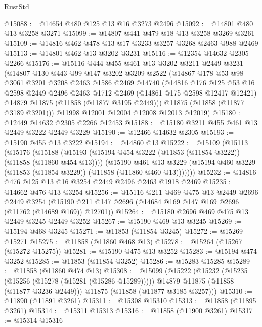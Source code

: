 \begin{lexlean}{RustStd}
\begin{coremodule}
@15088 := @14654 @480 @125 @13 @16 @3273 @2496
@15092 := @14801 @480 @13 @3258 @3271
@15099 := @14807 @441 @479 @18 @13 @3258 @3269 @3261
@15109 := @14816 @462 @478 @13 @17 @3233 @3257 @3268 @2463 @988 @2469
@15113 := @14801 @462 @13 @3202 @3231
@15116 := @12354 @14632 @2305 @2266
@15176 := @15116
    @444
    @455
    @461
    @13
    @3202
    @3211
    @2449
    @3231
    (@14807
      @130
      @443
      @99
      @147
      @3202
      @3209
      @2522
      (@14867
        @178
        @53
        @98
        @3061
        @3201
        @3208
        @2463
        @1586
        @2469
        @14740
        (@14816
          @176
          @125
          @53
          @16
          @2598
          @2449
          @2496
          @2463
          @1712
          @2469
          (@14861 @175 @2598 @12417 @12421)
          @14879
          @11875
          (@11858 (@11877 @3195 @2449)))
        @11875
        (@11858 (@11877 @3189 @3201)))
      @11998
      @12001
      @12004
      @12008
      @12013
      @12019)
@15180 := @12449 @14632 @2305 @2266 @12453
@15188 := @15180 @3211 @455 @461 @13 @2449 @3222 @2449 @3229
@15190 := @12466 @14632 @2305
@15193 := @15190 @455 @13 @3222
@15194 := @14860 @13
@15222 := @15109
    (@15113
      (@15176
        (@15188
          (@15193 (@15194 @454 @3222 (@11853 (@11854 @3222)) (@11858 (@11860 @454 @13))))
          (@15190
            @461
            @13
            @3229
            (@15194 @460 @3229 (@11853 (@11854 @3229)) (@11858 (@11860 @460 @13)))))))
@15232 := @14816 @476 @125 @13 @16 @3254 @2449 @2496 @2463 @1918 @2469
@15235 := @14662 @476 @13 @3254
@15256 := @15116
    @211
    @469
    @475
    @13
    @2449
    @2696
    @2449
    @3254
    (@15190 @211 @147 @2696 (@14684 @169 @147 @169 @2696 (@11762 (@14689 @169)) @12701))
@15264 := @15180 @2696 @469 @475 @13 @2449 @3245 @2449 @3252
@15267 := @15190 @469 @13 @3245
@15269 := @15194 @468 @3245
@15271 := @11853 (@11854 @3245)
@15272 := @15269 @15271
@15275 := @11858 (@11860 @468 @13)
@15278 := @15264 (@15267 (@15272 @15275))
@15281 := @15190 @475 @13 @3252
@15283 := @15194 @474 @3252
@15285 := @11853 (@11854 @3252)
@15286 := @15283 @15285
@15289 := @11858 (@11860 @474 @13)
@15308 := @15099
    (@15222
      (@15232
        (@15235 (@15256 (@15278 (@15281 (@15286 @15289)))))
        @14879
        @11875
        (@11858 (@11877 @3236 @2449)))
      @11875
      (@11858 (@11877 @3185 @3257)))
@15310 := @11890 (@11891 @3261)
@15311 := @15308 @15310
@15313 := @11858 (@11895 @3261)
@15314 := @15311 @15313
@15316 := @11858 (@11900 @3261)
@15317 := @15314 @15316

\end{coremodule}
\end{lexlean}

